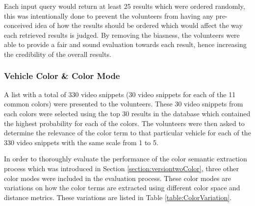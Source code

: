  Each input query would return at least 25 results which were ordered randomly, this was intentionally done to prevent the volunteers from having any pre-conceived idea of how the results should be ordered which would affect the way each retrieved results is judged. By removing the biasness, the volunteers were able to provide a fair and sound evaluation towards each result, hence increasing the credibility of the overall results.

 

\subsubsection{Vehicle Color \& Color Mode}
\label{subsec:vehColor}
A list with a total of 330 video snippets (30 video snippets for each of the 11 common colors) were presented to the volunteers. These 30 video snippets from each colors were selected using the top 30 results in the database which contained the highest probability for each of the colors. The volunteers were then asked to determine the relevance of the color term to that particular vehicle for each of the 330 video snippets with the same scale from 1 to 5. 

In order to thoroughly evaluate the performance of the color semantic extraction process which was introduced in Section \ref{section:versiontwoColor}, three other color modes were included in the evaluation process. These color modes are variations on how the color terms are extracted using different color space and distance metrics. These variations are listed in Table \ref{table:ColorVariation}.    

